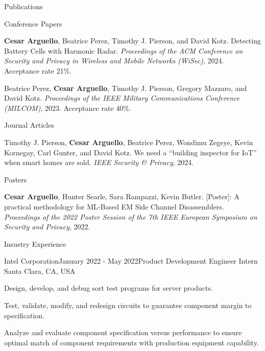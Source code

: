 \documentclass{resume} %
\begin{document}
\begin{rSection}{Publications}
  \begin{rSubsection_Conference}{Conference Papers}
    \item \textbf{Cesar Arguello}, Beatrice Perez, Timothy J. Pierson, and David Kotz. Detecting Battery Cells with Harmonic Radar. \textit{Proceedings of the ACM Conference on Security and Privacy in Wireless and Mobile Networks (WiSec)}, 2024. Acceptance rate 21\%.
    \item Beatrice Perez, \textbf{Cesar Arguello}, Timothy J. Pierson, Gregory Mazzaro, and David Kotz. \textit{Proceedings of the IEEE Military Communications Conference (MILCOM)}, 2023. Acceptance rate 40\%. 
  \end{rSubsection_Conference}

  \begin{rSubsection_Journal}{Journal Articles}{}
  \item Timothy J. Pierson, \textbf{Cesar Arguello}, Beatrice Perez, Wondimu Zegeye, Kevin Kornegay, Carl Gunter, and David Kotz. We need a “building inspector for IoT” when smart homes are sold. \textit{IEEE Security \& Privacy}, 2024. 
  \end{rSubsection_Journal}

  \begin{rSubsection_Poster}{Posters}{}{}{}
  \item \textbf{Cesar Arguello}, Hunter Searle, Sara Rampazzi, Kevin Butler. [Poster]: A practical methodology for ML-Based EM Side Channel Disassemblers. \textit{Proceedings of the 2022 Poster Session of the 7th IEEE European Symposium on Security and Privacy}, 2022.
  \end{rSubsection_Poster}
\end{rSection}


\begin{rSection}{Insustry Experience}
\begin{rSubsection}{Intel Corporation}{January 2022 - May 2022}{Product Development Engineer Intern }{Santa Clara, CA, USA}
  \item Design, develop, and debug sort test programs for server products. 
  \item Test, validate, modify, and redesign circuits to guarantee component margin to
specification. 
  \item Analyze and evaluate component specification versus performance to ensure optimal
match of component requirements with production equipment capability.
\end{rSubsection}
\end{rSection}
\end{document}
